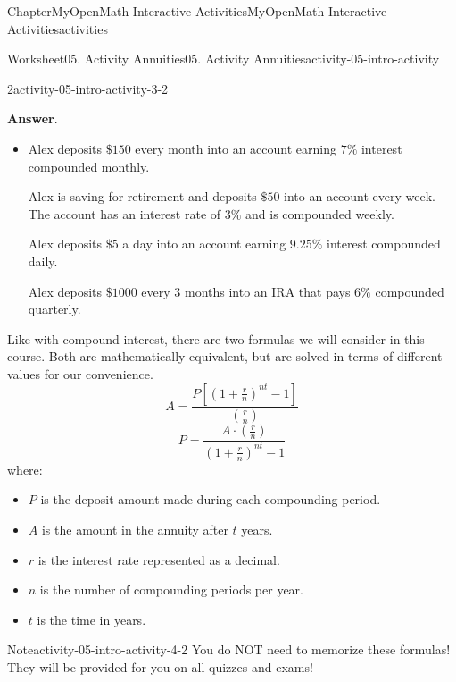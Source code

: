 \documentclass[oneside,10pt,]{book}
\newcommand{\blocktitlefont}{\relax}
\newcommand{\ptxlistdisc}{\raisebox{0.3ex}{\textbullet}}
\begin{document}
\begin{chapterptx}{Chapter}{MyOpenMath Interactive Activities}{}{MyOpenMath Interactive Activities}{}{}{activities}
\begin{worksheet-section}{Worksheet}{05. Activity Annuities}{}{05. Activity Annuities}{}{}{activity-05-intro-activity}
\begin{divisionexercise}{2}{}{}{activity-05-intro-activity-3-2}
\begin{enumerate}[label={(\alph*)}]
\end{enumerate}
%
\par\smallskip%
\noindent\textbf{\blocktitlefont Answer}.\hypertarget{activity-05-intro-activity-3-2-2}{}\quad{}%
\begin{itemize}[label=\ptxlistdisc]
\item{}Alex deposits \(\displaystyle\${150}\) every month into an account earning \(\displaystyle{7}\%\) interest compounded monthly.%
\par
Alex is saving for retirement and deposits \(\displaystyle\${50}\) into an account every week. The account has an interest rate of \(\displaystyle{3}\%\) and is compounded weekly.\textdollar{}%
\par
Alex deposits \(\displaystyle\${5}\) a day into an account earning \(\displaystyle{9.25}\%\) interest compounded daily.%
\par
Alex deposits \(\displaystyle\${1000}\) every 3 months into an IRA that pays \(\displaystyle{6}\%\) compounded quarterly.%
\end{itemize}
%
\end{divisionexercise}%
\clearpage
Like with compound interest, there are two formulas we will consider in this course. Both are mathematically equivalent, but are solved in terms of different values for our convenience.%
\begin{equation*}
A = \frac{P\left[\left(1 + \frac{r}{n}\right)^{nt} - 1\right]}{\left(\frac{r}{n}\right)}
\end{equation*}
%
\begin{equation*}
P = \frac{A \cdot \left(\frac{r}{n}\right)}{\left(1 + \frac{r}{n}\right)^{nt} - 1}
\end{equation*}
where:%
\begin{itemize}[label=\ptxlistdisc]
\item{}\(P\) is the deposit amount made during each compounding period.%
\item{}\(A\) is the amount in the annuity after \(t\) years.%
\item{}\(r\) is the interest rate represented as a decimal.%
\item{}\(n\) is the number of compounding periods per year.%
\item{}\(t\) is the time in years.%
\end{itemize}
%
\begin{note}{Note}{}{activity-05-intro-activity-4-2}%
You do NOT need to memorize these formulas! They will be provided for you on all quizzes and exams!%
\end{note}

\end{worksheet-section}
\end{chapterptx}
\end{document}
